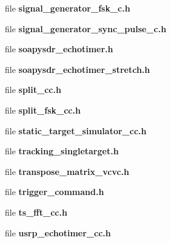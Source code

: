 \begin{DoxyCompactItemize}
\item 
file {\bf signal\+\_\+generator\+\_\+fsk\+\_\+c.\+h}
\item 
file {\bf signal\+\_\+generator\+\_\+sync\+\_\+pulse\+\_\+c.\+h}
\item 
file {\bf soapysdr\+\_\+echotimer.\+h}
\item 
file {\bf soapysdr\+\_\+echotimer\+\_\+stretch.\+h}
\item 
file {\bf split\+\_\+cc.\+h}
\item 
file {\bf split\+\_\+fsk\+\_\+cc.\+h}
\item 
file {\bf static\+\_\+target\+\_\+simulator\+\_\+cc.\+h}
\item 
file {\bf tracking\+\_\+singletarget.\+h}
\item 
file {\bf transpose\+\_\+matrix\+\_\+vcvc.\+h}
\item 
file {\bf trigger\+\_\+command.\+h}
\item 
file {\bf ts\+\_\+fft\+\_\+cc.\+h}
\item 
file {\bf usrp\+\_\+echotimer\+\_\+cc.\+h}
\end{DoxyCompactItemize}
